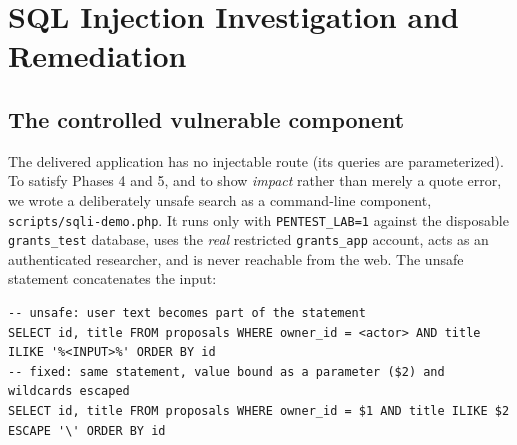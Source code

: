 \documentclass[10pt,a4paper]{article}
\newcommand{\code}[1]{\nolinkurl{#1}}
\begin{document}
\section{SQL Injection Investigation and Remediation}\label{sec:sqli}

\subsection{The controlled vulnerable component}
The delivered application has no injectable route (its queries are parameterized). To satisfy Phases 4 and 5, and to show \emph{impact} rather than merely a quote error, we wrote a deliberately unsafe search as a command-line component, \code{scripts/sqli-demo.php}. It runs only with \code{PENTEST\_LAB=1} against the disposable \code{grants_test} database, uses the \emph{real} restricted \code{grants_app} account, acts as an authenticated researcher, and is never reachable from the web. The unsafe statement concatenates the input:
\begin{lstlisting}[language=SQLx]
-- unsafe: user text becomes part of the statement
SELECT id, title FROM proposals WHERE owner_id = <actor> AND title ILIKE '%<INPUT>%' ORDER BY id
-- fixed: same statement, value bound as a parameter ($2) and wildcards escaped
SELECT id, title FROM proposals WHERE owner_id = $1 AND title ILIKE $2 ESCAPE '\' ORDER BY id
\end{lstlisting}
\end{document}
